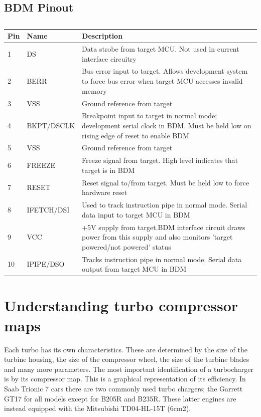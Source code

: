 \documentclass[11pt,a4paper]{book}
\begin{document}
\section{BDM Pinout}
\begin{table}
    \centering
    \begin{tabular}{lll}
        Pin &  Name &  Description  \\
        \midrule
        1 &DS & Data strobe from target MCU. Not used
        in current interface circuitry \\
        2 &BERR &
        Bus error input to target. Allows
        development system to force bus error
        when target MCU accesses invalid
        memory \\
        3 &VSS & Ground reference from target \\
        4 &BKPT/DSCLK &
        Breakpoint input to target in normal
        mode; development serial clock in
        BDM. Must be held low on rising edge
        of reset to enable BDM \\
        5 &VSS & Ground reference from target \\
        6 &FREEZE & Freeze signal from target. High level
        indicates that target is in BDM \\
        7 &RESET & Reset signal to/from target. Must be
        held low to force hardware reset \\
        8 &IFETCH/DSI &
        Used to track instruction pipe in normal
        mode. Serial data input to target MCU
        in BDM \\
        9 &VCC &
        +5V supply from target.BDM interface
        circuit draws power from this supply
        and also monitors 'target powered/not
        powered' status \\
        10 &IPIPE/DSO &
        Tracks instruction pipe in normal mode.
        Serial data output from target MCU in
        BDM
    \end{tabular}
    \caption{}
    \label{tab:}
\end{table}

\chapter{Understanding turbo compressor maps}
Each turbo has its own characteristics. These are determined by the size of the turbine housing, the
size of the compressor wheel, the size of the turbine blades and many more parameters.
The most important identification of a turbocharger is by its compressor map. This is a graphical
representation of its efficiency. In Saab Trionic 7 cars there are two commonly
used turbo chargers; the
Garrett GT17 for all models except for B205R and B235R. These latter engines are
instead equipped with the Mitsubishi TD04-HL-15T (6cm2).
\end{document}
